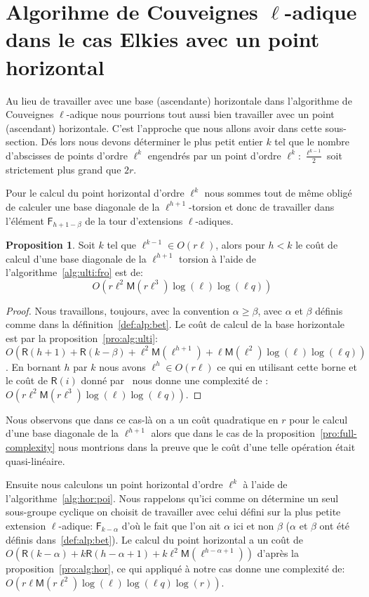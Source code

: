 \documentclass[10pt,a4paper]{book}
\theoremstyle{plain}
\theoremstyle{definition}
\theoremstyle{definition}
\theoremstyle{definition}
\theoremstyle{definition}
\newtheorem{prop}[thm]{Proposition}
\theoremstyle{definition}
\theoremstyle{remark}
\theoremstyle{remark}
\theoremstyle{definition}
\begin{document}
\section{Algorihme de Couveignes $\ell$-adique dans le cas Elkies avec un point horizontal}
\label{sec:var:cou:uni}


Au lieu de travailler avec une base (ascendante) horizontale dans l'algorithme 
de Couveignes $\ell$-adique nous pourrions tout aussi bien travailler avec un 
point (ascendant) horizontale. C'est l'approche que nous allons avoir dans 
cette sous-section.
Dés lors nous devons déterminer le plus petit entier $k$ tel que le nombre 
d'abscisses de points d'ordre $\ell^k$ engendrés par un point d'ordre $\ell^k$:
$\frac{\ell^{k-1}}{2}$ soit strictement plus grand que $2r$.

Pour le calcul du point horizontal d'ordre $\ell^k$ nous sommes tout de même 
obligé de calculer une base diagonale de la $\ell^{h+1}$-torsion et donc de 
travailler dans l'élément $\mathsf{F}_{h+1-\beta}$ de la tour d'extensions 
$\ell$-adiques.

\begin{prop}
Soit $k$ tel que $\ell^{k-1} \in O(r\ell)$, alors pour $h<k$ le coût de calcul d'une 
base diagonale de la $\ell^{h+1}$ torsion à l'aide de 
l'algorithme~\ref{alg:ulti:fro} est de:
\[
O(r \ell^{2} \mathsf{M}(r\ell^{3})\log(\ell)\log(\ell q) )
\]
\end{prop}

\begin{proof}
Nous travaillons, toujours, avec la convention $\alpha \geqslant \beta$, 
avec $\alpha$ et $\beta$ définis comme dans la définition~\ref{def:alp:bet}.
Le coût de calcul de la base horizontale est par la proposition~\ref{pro:alg:ulti}:
$O(\mathsf{R}(h+1)+ \mathsf{R}(k-\beta)+\ell^2 \mathsf{M}(\ell^{h+1})+\ell \mathsf{M}(\ell^2)\log(\ell)\log(\ell q))$. 
En bornant $h$ par $k$ nous avons $\ell^h \in O(r\ell)$ ce qui en utilisant 
cette borne et le coût de $\mathsf{R}(i)$ donné 
par~\cite[chapter 14.5]{vzGJG03} nous donne une complexité de :
$O(r \ell^{2} \mathsf{M}(r\ell^{3})\log(\ell)\log(\ell q) )$.
\end{proof}
Nous observons que dans ce cas-là on a un coût quadratique en $r$ pour le 
calcul d'une base diagonale de la $\ell^{h+1}$ alors que dans le cas de la 
proposition~\ref{pro:full-complexity} nous montrions dans la preuve que le coût 
d'une telle opération était quasi-linéaire.

Ensuite nous calculons un point horizontal d'ordre $\ell^k$ à l'aide de 
l'algorithme~\ref{alg:hor:poi}. Nous rappelons qu'ici comme on détermine un seul 
sous-groupe cyclique on choisit de travailler avec celui défini 
sur la plus petite extension $\ell$-adique: $\mathsf{F}_{k-\alpha}$ d'où le 
fait que l'on ait $\alpha$ ici et non $\beta$ ($\alpha$ et $\beta$ 
ont été définis dans~\ref{def:alp:bet}). Le calcul du point horizontal a un 
coût de 
$O(\mathsf{R}(k-\alpha) + k\mathsf{R}(h-\alpha+1) + k\ell^2\mathsf{M}(\ell^{h-\alpha+1}))$
d'après la proposition~\ref{pro:alg:hor}, ce qui appliqué à notre cas donne 
une complexité de: $O(r \ell \mathsf{M}(r \ell^{2})\log(\ell)\log(\ell q) \log(r))$.
\end{document}
